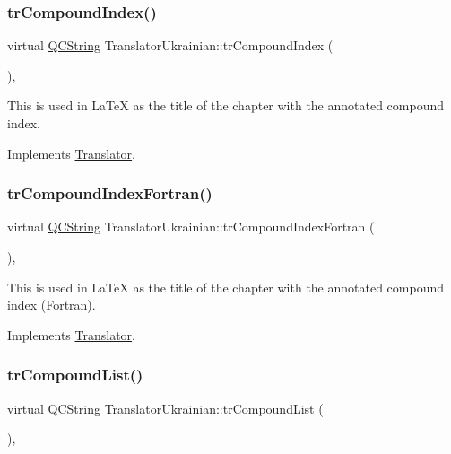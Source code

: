 \subsubsection{\texorpdfstring{trCompoundIndex()}{trCompoundIndex()}}
{\footnotesize\ttfamily virtual \mbox{\hyperlink{class_q_c_string}{Q\+C\+String}} Translator\+Ukrainian\+::tr\+Compound\+Index (\begin{DoxyParamCaption}{ }\end{DoxyParamCaption})\hspace{0.3cm}{\ttfamily [inline]}, {\ttfamily [virtual]}}

This is used in La\+TeX as the title of the chapter with the annotated compound index. 

Implements \mbox{\hyperlink{class_translator}{Translator}}.

\mbox{\label{class_translator_ukrainian_ac2f76ab8a6180f4699859869ae72697e}} 
\subsubsection{\texorpdfstring{trCompoundIndexFortran()}{trCompoundIndexFortran()}}
{\footnotesize\ttfamily virtual \mbox{\hyperlink{class_q_c_string}{Q\+C\+String}} Translator\+Ukrainian\+::tr\+Compound\+Index\+Fortran (\begin{DoxyParamCaption}{ }\end{DoxyParamCaption})\hspace{0.3cm}{\ttfamily [inline]}, {\ttfamily [virtual]}}

This is used in La\+TeX as the title of the chapter with the annotated compound index (Fortran). 

Implements \mbox{\hyperlink{class_translator}{Translator}}.

\mbox{\label{class_translator_ukrainian_aa13766d6f94e17883c818055fa160a7e}} 
\subsubsection{\texorpdfstring{trCompoundList()}{trCompoundList()}}
{\footnotesize\ttfamily virtual \mbox{\hyperlink{class_q_c_string}{Q\+C\+String}} Translator\+Ukrainian\+::tr\+Compound\+List (\begin{DoxyParamCaption}{ }\end{DoxyParamCaption})\hspace{0.3cm}{\ttfamily [inline]}, {\ttfamily [virtual]}}

